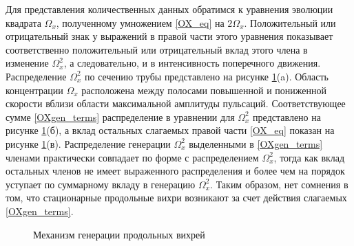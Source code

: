 Для представления количественных данных обратимся к уравнения эволюции квадрата $\Omega_x$, полученному умножением \eqref{OX_eq} на $2\Omega_x$. Положительный или отрицательный знак у выражений в правой части этого уравнения показывает соответственно положительный или отрицательный вклад этого члена в изменение $\Omega^2_x$, а следовательно, и в интенсивность поперечного движения. Распределение $\Omega^2_x$ по сечению трубы представлено на рисунке \ref{OXgen_pic}(a). Область концентрации $\Omega_x$ расположена между полосами повышенной и пониженной скорости вблизи области максимальной амплитуды пульсаций. Соответствующее сумме \eqref{OXgen_terms} распределение в уравнении для $\Omega^2_x$ представлено на рисунке \ref{OXgen_pic}(б), а вклад остальных слагаемых правой части \eqref{OX_eq} показан на рисунке \ref{OXgen_pic}(в). Распределение генерации $\Omega^2_x$ выделенными в \eqref{OXgen_terms} членами практически совпадает по форме с распределением $\Omega^2_x$, тогда как вклад остальных членов не имеет выраженного распределения и более чем на порядок уступает по суммарному вкладу в генерацию $\Omega^2_x$. Таким образом, нет сомнения в том, что стационарные продольные вихри возникают за счет действия слагаемых \eqref{OXgen_terms}.

\begin{figure}
\caption{Механизм генерации продольных вихрей}
\label{OXgen_pic}
\end{figure}

